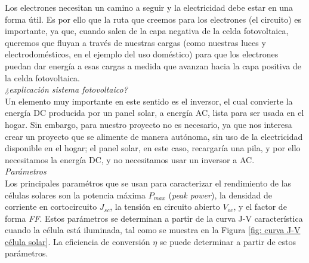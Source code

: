 \documentclass[12pt]{article}
\begin{document}
	\pagebreak
	
	\noindent Los electrones necesitan un camino a seguir y la electricidad debe estar en una forma útil. Es por ello que la ruta que creemos para los electrones (el circuito) es importante, ya que, cuando salen de la capa negativa de la celda fotovoltaica, queremos que fluyan a través de nuestras cargas (como nuestras luces y electrodomésticos, en el ejemplo del uso doméstico) para que los electrones puedan dar energía a esas cargas a medida que avanzan hacia la capa positiva de la celda fotovoltaica. \\
	
	\noindent \textit{¿explicación sistema fotovoltaico?} \\
	
	\noindent Un elemento muy importante en este sentido es el inversor, el cual convierte la energía DC producida por un panel solar, a energía AC, lista para ser usada en el hogar. Sin embargo, para nuestro proyecto no es necesario, ya que nos interesa crear un proyecto que se alimente de manera autónoma, sin uso de la electricidad disponible en el hogar; el panel solar, en este caso, recargaría una pila, y por ello necesitamos la energía DC, y no necesitamos usar un inversor a AC. \\ 
	
	\noindent \textit{Parámetros}\\
	
	\noindent Los principales paramétros que se usan para caracterizar el rendimiento de las células solares son la potencia máxima $P_{max}$ (\textit{peak power}), la densidad de corriente en cortocircuito $J_{sc}$, la tensión en circuito abierto $V_{oc}$, y el factor de forma \textit{FF}. Estos parámetros se determinan a partir de la curva J-V característica cuando la célula está iluminada, tal como se muestra en la Figura \ref{fig: curva J-V célula solar}. La eficiencia de conversión $\eta$ se puede determinar a partir de estos parámetros. \\
	
\end{document}

